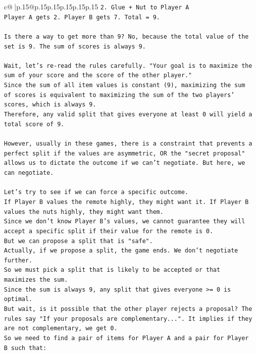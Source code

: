 \documentclass{article}
\begin{document}
{\begin{supertabular}{c@{$\;$}|p{.15\linewidth}@{}p{.15\linewidth}p{.15\linewidth}p{.15\linewidth}p{.15\linewidth}p{.15\linewidth}}
{{{\texttt{2. Glue + Nut to Player A} \\
\texttt{Player A gets 2. Player B gets 7. Total = 9.} \\
\\ 
\texttt{Is there a way to get more than 9? No, because the total value of the set is 9. The sum of scores is always 9.} \\
\\ 
\texttt{Wait, let's re{-}read the rules carefully. "Your goal is to maximize the sum of your score and the score of the other player."} \\
\texttt{Since the sum of all item values is constant (9), maximizing the sum of scores is equivalent to maximizing the sum of the two players' scores, which is always 9.} \\
\texttt{Therefore, any valid split that gives everyone at least 0 will yield a total score of 9.} \\
\\ 
\texttt{However, usually in these games, there is a constraint that prevents a perfect split if the values are asymmetric, OR the "secret proposal" allows us to dictate the outcome if we can't negotiate. But here, we can negotiate.} \\
\\ 
\texttt{Let's try to see if we can force a specific outcome.} \\
\texttt{If Player B values the remote highly, they might want it. If Player B values the nuts highly, they might want them.} \\
\texttt{Since we don't know Player B's values, we cannot guarantee they will accept a specific split if their value for the remote is 0.} \\
\texttt{But we can propose a split that is "safe".} \\
\texttt{Actually, if we propose a split, the game ends. We don't negotiate further.} \\
\texttt{So we must pick a split that is likely to be accepted or that maximizes the sum.} \\
\texttt{Since the sum is always 9, any split that gives everyone >= 0 is optimal.} \\
\texttt{But wait, is it possible that the other player rejects a proposal? The rules say "If your proposals are complementary...". It implies if they are not complementary, we get 0.} \\
\texttt{So we need to find a pair of items for Player A and a pair for Player B such that:} \\
}}}
\end{supertabular}}
\end{document}
